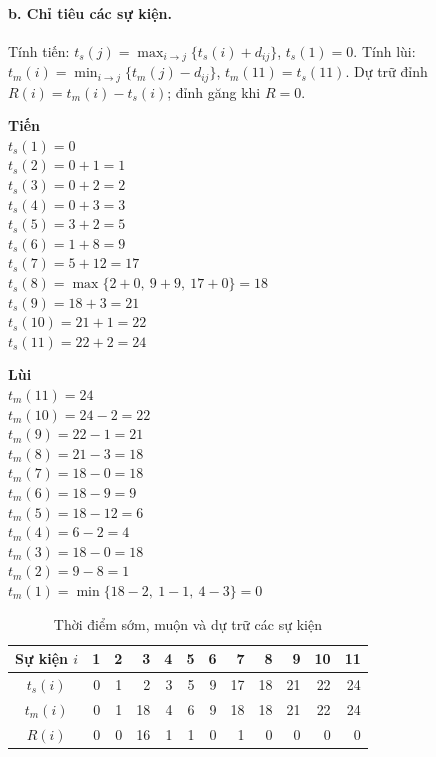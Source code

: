 \documentclass[12pt,a4paper]{article}
\begin{document}
\paragraph{b. Chỉ tiêu các sự kiện.}
Tính tiến: $t_s(j)=\max_{i\rightarrow j}\{t_s(i)+d_{ij}\}$, $t_s(1)=0$.
Tính lùi: $t_m(i)=\min_{i\rightarrow j}\{t_m(j)-d_{ij}\}$, $t_m(11)=t_s(11)$.
Dự trữ đỉnh $R(i)=t_m(i)-t_s(i)$; đỉnh găng khi $R=0$.

{\small
\begin{minipage}[t]{0.49\textwidth}
\textbf{Tiến}\\[1pt]
$t_s(1)=0$\\
$t_s(2)=0+1=1$\\
$t_s(3)=0+2=2$\\
$t_s(4)=0+3=3$\\
$t_s(5)=3+2=5$\\
$t_s(6)=1+8=9$\\
$t_s(7)=5+12=17$\\
$t_s(8)=\max\{2+0,\ 9+9,\ 17+0\}=18$\\
$t_s(9)=18+3=21$\\
$t_s(10)=21+1=22$\\
$t_s(11)=22+2=24$
\end{minipage}
\hfill
\begin{minipage}[t]{0.49\textwidth}
\textbf{Lùi}\\[1pt]
$t_m(11)=24$\\
$t_m(10)=24-2=22$\\
$t_m(9)=22-1=21$\\
$t_m(8)=21-3=18$\\
$t_m(7)=18-0=18$\\
$t_m(6)=18-9=9$\\
$t_m(5)=18-12=6$\\
$t_m(4)=6-2=4$\\
$t_m(3)=18-0=18$\\
$t_m(2)=9-8=1$\\
$t_m(1)=\min\{18-2,\ 1-1,\ 4-3\}=0$
\end{minipage}
}

\begin{table}[H]\centering
\caption{Thời điểm sớm, muộn và dự trữ các sự kiện}
\small
\begin{tabular}{c|rrrrrrrrrrr}
\toprule
Sự kiện $i$ & 1 & 2 & 3 & 4 & 5 & 6 & 7 & 8 & 9 & 10 & 11\\
\midrule
$t_s(i)$ & 0 & 1 & 2 & 3 & 5 & 9 & 17 & 18 & 21 & 22 & 24\\
$t_m(i)$ & 0 & 1 & 18 & 4 & 6 & 9 & 18 & 18 & 21 & 22 & 24\\
$R(i)$   & 0 & 0 & 16 & 1 & 1 & 0 & 1 & 0 & 0 & 0 & 0\\
\bottomrule
\end{tabular}
\end{table}
\end{document}
